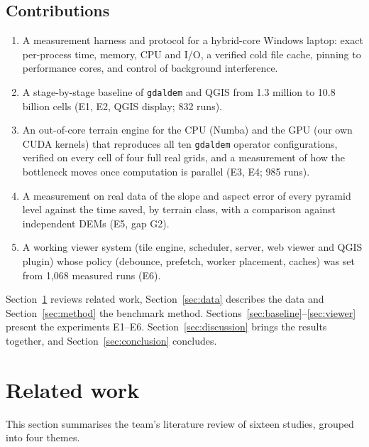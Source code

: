 \documentclass[11pt,a4paper]{article}
\begin{document}
\subsection{Contributions}
\begin{enumerate}
  \item A measurement harness and protocol for a hybrid-core Windows laptop: exact per-process time, memory, CPU and
  I/O, a verified cold file cache, pinning to performance cores, and control of background interference.
  \item A stage-by-stage baseline of \texttt{gdaldem} and QGIS from 1.3 million to 10.8 billion cells (E1, E2, QGIS
  display; 832 runs).
  \item An out-of-core terrain engine for the CPU (Numba) and the GPU (our own CUDA kernels) that reproduces all ten
  \texttt{gdaldem} operator configurations, verified on every cell of four full real grids, and a measurement of how
  the bottleneck moves once computation is parallel (E3, E4; 985 runs).
  \item A measurement on real data of the slope and aspect error of every pyramid level against the time saved, by
  terrain class, with a comparison against independent DEMs (E5, gap G2).
  \item A working viewer system (tile engine, scheduler, server, web viewer and QGIS plugin) whose policy (debounce,
  prefetch, worker placement, caches) was set from 1{,}068 measured runs (E6).
\end{enumerate}
Section~\ref{sec:related} reviews related work, Section~\ref{sec:data} describes the data and
Section~\ref{sec:method} the benchmark method. Sections~\ref{sec:baseline}--\ref{sec:viewer} present the
experiments E1--E6. Section~\ref{sec:discussion} brings the results together, and Section~\ref{sec:conclusion}
concludes.

\section{Related work}\label{sec:related}
This section summarises the team's literature review of sixteen studies, grouped into four themes.
\end{document}
